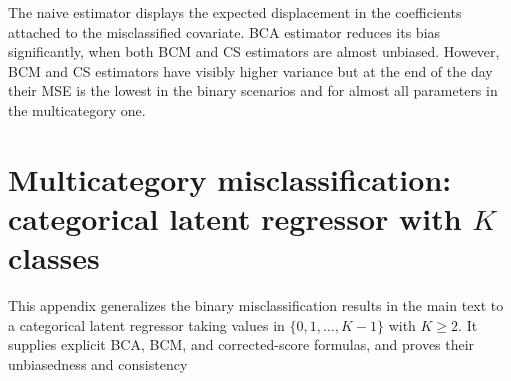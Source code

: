 \documentclass[11pt]{article}
\theoremstyle{definition}
\theoremstyle{remark}
\begin{document}
The naive estimator displays the expected displacement in the coefficients attached to the misclassified covariate. BCA estimator reduces its bias significantly, when both BCM and CS estimators are almost unbiased. However, BCM and CS estimators have visibly higher variance but at the end of the day their MSE is the lowest in the binary scenarios and for almost all parameters in the multicategory one.


\clearpage

\appendix


\setcounter{theorem}{0}
\setcounter{proposition}{0}
\setcounter{lemma}{0}
\setcounter{corollary}{0}
\setcounter{assumption}{0}
\setcounter{definition}{0}
\setcounter{remark}{0}
\renewcommand{\thetheorem}{A.\arabic{theorem}}
\renewcommand{\theproposition}{A.\arabic{proposition}}
\renewcommand{\thelemma}{A.\arabic{lemma}}
\renewcommand{\thecorollary}{A.\arabic{corollary}}
\renewcommand{\theassumption}{A.\arabic{assumption}}
\renewcommand{\thedefinition}{A.\arabic{definition}}
\renewcommand{\theremark}{A.\arabic{remark}}
\renewcommand{\theHtheorem}{A.\arabic{theorem}}
\renewcommand{\theHproposition}{A.\arabic{proposition}}
\renewcommand{\theHlemma}{A.\arabic{lemma}}
\renewcommand{\theHcorollary}{A.\arabic{corollary}}
\renewcommand{\theHassumption}{A.\arabic{assumption}}
\renewcommand{\theHdefinition}{A.\arabic{definition}}
\renewcommand{\theHremark}{A.\arabic{remark}}


\section{Multicategory misclassification: categorical latent regressor with $K$ classes}\label{app:multiclass}

This appendix generalizes the binary misclassification results in the main text to a categorical latent regressor taking values in $\{0,1,\dots,K-1\}$ with $K\ge 2$. It supplies explicit BCA, BCM, and corrected-score formulas, and
proves their unbiasedness and consistency
\end{document}
